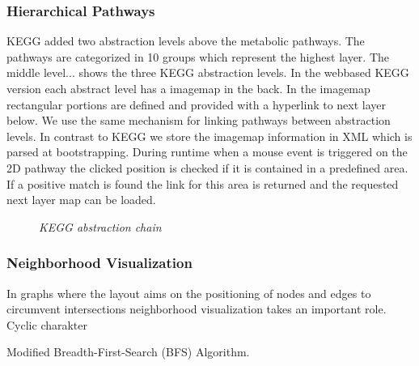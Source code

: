 \subsubsection{Hierarchical Pathways}

KEGG added two abstraction levels above the metabolic pathways. The pathways are categorized in 10 groups which represent the highest layer. The middle level...
 shows the three KEGG abstraction levels. 
In the webbased KEGG version each abstract level has a imagemap in the back. In the imagemap rectangular portions are defined and provided with a hyperlink to next layer below. We use the same mechanism for linking pathways between abstraction levels. In contrast to KEGG we store the imagemap information in XML which is parsed at bootstrapping. During runtime when a mouse event is triggered on the 2D pathway the clicked position is checked if it is contained in a predefined area. If a positive match is found the link for this area is returned and the requested next layer map can be loaded.

\begin{figure}[ht]
\centering
{} 
\caption[KEGG abstraction chain]{\textit{KEGG abstraction chain}} 
\label{gfx:KEGG_abstraction_chain}
\end{figure}

\subsubsection{Neighborhood Visualization}

In graphs where the layout aims on the positioning of nodes and edges to circumvent intersections neighborhood visualization takes an important role. 
Cyclic charakter

Modified Breadth-First-Search (BFS) Algorithm.

